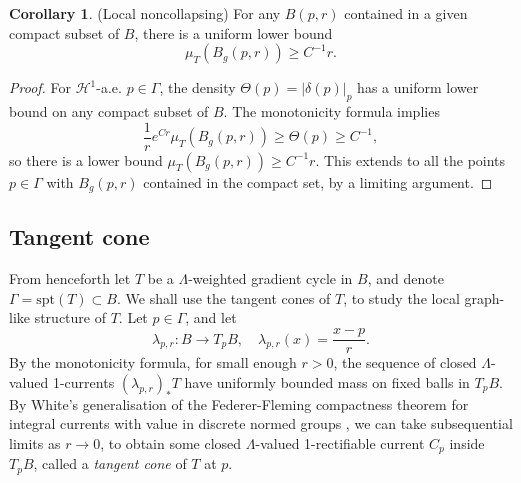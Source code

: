 \documentclass{article}
\theoremstyle{definition}
\newtheorem{cor}[thm]{Corollary}
\begin{document}
		
	
	
	\begin{cor}\label{cor:noncollapsing}
		(Local noncollapsing) For any $B(p,r)$ contained in a given compact subset of $B$, there is a uniform lower bound
		\[
		\mu_T(  B_g(p,r) ) \geq C^{-1} r.
		\]
	\end{cor}				
	
	
	\begin{proof}
		For $\mathcal{H}^1$-a.e. $p\in \Gamma$, the density $\Theta(p)= |\delta(p)|_p$ has a uniform lower bound on any compact subset of $B$. The monotonicity formula implies
		\[
		\frac{1}{r}e^{Cr}	\mu_T(  B_g(p,r) ) \geq \Theta(p)\geq C^{-1},
		\]
		so there is a lower bound $\mu_T(   B_g(p,r)   )\geq C^{-1} r$. This extends to all the points $p\in \Gamma$ with $B_g(p,r)$ contained in the compact set, by a limiting argument.
	\end{proof}
		
		
	
		
		\subsection{Tangent cone}
		
					
		From henceforth	let $T$ be a $\Lambda$-weighted gradient cycle in $B$, and denote $\Gamma= \text{spt}(T)\subset B$. We shall use the tangent cones of $T$, to study the local graph-like structure of $T$.
	Let $p\in \Gamma $, and let \[
	\lambda_{p,r} : B\to T_pB,    \quad \lambda_{p,r}(x)= \frac{x-p}{r}.
	\]
	  By the monotonicity formula, for small enough $r>0$, the sequence of closed $\Lambda$-valued 1-currents $(\lambda_{p,r})_* T$ have uniformly bounded mass on fixed balls in $T_p B$. By White's generalisation of the Federer-Fleming compactness theorem for integral currents with value in discrete normed groups \cite{White}, we can take subsequential limits as $r\to 0$, to obtain some closed $\Lambda$-valued 1-rectifiable current $ C_p$ inside $T_p B$, called a \emph{tangent cone} of $T$ at $p$. 
		
		
		

		
		
\end{document}
